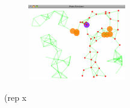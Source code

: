 \documentclass{article}
\begin{document}
\begin{figure}
  \vspace{-0.8cm}
  \includegraphics[width=0.38\textwidth]{figures/blocked-distance.png}
  \caption{}
  \vspace{-0.5cm}
  \label{f:blockdist}
\end{figure}


(rep x
\end{document}
